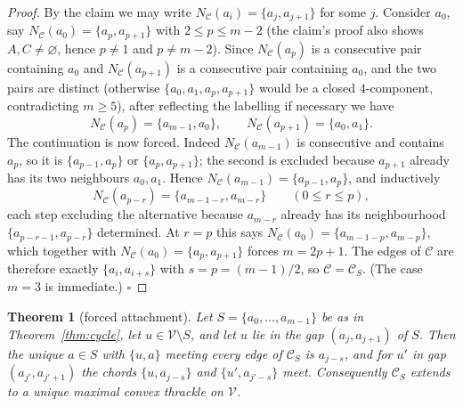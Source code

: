 \documentclass[11pt,a4paper]{article}
\newtheorem{theorem}{Theorem}[section]
\theoremstyle{definition}
\theoremstyle{plain}
\newcommand{\V}{\mathcal{V}}
\newcommand{\mc}{\mathcal{C}}
\begin{document}
\begin{proof}
By the claim we may write $N_\mc(a_i)=\{a_j,a_{j+1}\}$ for some $j$.  Consider
$a_0$, say $N_\mc(a_0)=\{a_p,a_{p+1}\}$ with $2\le p\le m-2$ (the claim's
proof also shows $A,C\ne\varnothing$, hence $p\ne1$ and $p\ne m-2$).  Since
$N_\mc(a_p)$ is a consecutive pair containing $a_0$ and
$N_\mc(a_{p+1})$ is a consecutive pair containing $a_0$, and the two pairs are
distinct (otherwise $\{a_0,a_1,a_p,a_{p+1}\}$ would be a closed $4$-component,
contradicting $m\ge5$), after reflecting the labelling if necessary we have
\[
N_\mc(a_p)=\{a_{m-1},a_0\},\qquad N_\mc(a_{p+1})=\{a_0,a_1\}.
\]
The continuation is now forced.  Indeed $N_\mc(a_{m-1})$ is consecutive and
contains $a_p$, so it is $\{a_{p-1},a_p\}$ or $\{a_p,a_{p+1}\}$; the second is
excluded because $a_{p+1}$ already has its two neighbours $a_0,a_1$.  Hence
$N_\mc(a_{m-1})=\{a_{p-1},a_p\}$, and inductively
\[
N_\mc(a_{p-r})=\{a_{m-1-r},a_{m-r}\}\qquad(0\le r\le p),
\]
each step excluding the alternative because $a_{m-r}$ already has its
neighbourhood $\{a_{p-r-1},a_{p-r}\}$ determined.  At $r=p$ this says
$N_\mc(a_0)=\{a_{m-1-p},a_{m-p}\}$, which together with
$N_\mc(a_0)=\{a_p,a_{p+1}\}$ forces $m=2p+1$.  The edges of $\mc$ are therefore
exactly $\{a_i,a_{i+s}\}$ with $s=p=(m-1)/2$, so $\mc=\mc_S$.  (The case
$m=3$ is immediate.) \hfill\(\square\)
\end{proof}

\begin{theorem}[forced attachment]\label{thm:wedge}
Let $S=\{a_0,\dots,a_{m-1}\}$ be as in Theorem~\ref{thm:cycle}, let $u\in
\V\setminus S$, and let $u$ lie in the gap $(a_j,a_{j+1})$ of $S$.  Then the
unique $a\in S$ with $\{u,a\}$ meeting every edge of $\mc_S$ is $a_{j-s}$, and
for $u'$ in gap $(a_{j'},a_{j'+1})$ the chords $\{u,a_{j-s}\}$ and
$\{u',a_{j'-s}\}$ meet.  Consequently $\mc_S$ extends to a unique maximal convex
thrackle on $\V$.
\end{theorem}
\end{document}

